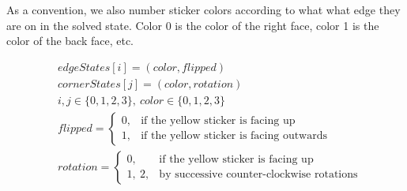 \documentclass{article}
\begin{document}
            As a convention, we also number sticker colors according to what
            what edge they are on in the solved state. Color 0 is the color of
            the right face, color 1 is the color of the back face, etc.

            \begin{align}
            &\nonumber edgeStates[i] = (color, flipped) \\
            &\nonumber cornerStates[j] = (color, rotation) \\
            &\nonumber i, j \in \{0, 1, 2, 3\},\ color \in \{0, 1, 2, 3\} \\
            &\nonumber flipped = \begin{cases}
                0, & \text{if the yellow sticker is facing up}\\
                1, & \text{if the yellow sticker is facing outwards}
            \end{cases} \\
            &\nonumber rotation = \begin{cases}
                0, & \text{if the yellow sticker is facing up}\\
                1,\ 2, & \text{by successive counter-clockwise rotations}
            \end{cases}
            \end{align}
            
\end{document}
